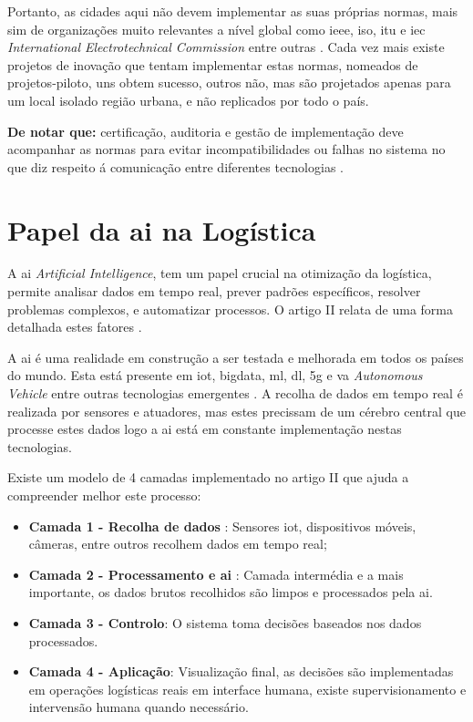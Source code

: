 Portanto, as cidades aqui não devem implementar as suas próprias normas, mais sim de organizações muito relevantes a nível global como \gls{ieee}, \gls{iso}, \gls{itu} e \gls{iec} \textit{International Electrotechnical Commission}  entre outras \cite{article}.
Cada vez mais existe projetos de inovação que tentam implementar estas normas, nomeados de projetos-piloto, uns obtem sucesso, outros não, mas são projetados apenas para um local isolado região urbana, e não replicados por todo o país.

\textbf{De notar que:} certificação, auditoria e gestão de implementação deve acompanhar as normas para evitar incompatibilidades ou falhas no sistema no que diz respeito á comunicação entre diferentes tecnologias \cite{article}.
\section{Papel da \gls{ai} na Logística}
\label{sec:papel_ai_logistica}
A \gls{ai} \textit{Artificial Intelligence}, tem um papel crucial na otimização da logística, permite analisar dados em tempo real, prever padrões específicos, resolver problemas complexos, e automatizar processos. O artigo II relata de uma forma detalhada estes fatores \cite{su162411265}.

A \gls{ai} é uma realidade em construção a ser testada e melhorada em todos os países do mundo. Esta está presente em \gls{iot}, \gls{bigdata}, \gls{ml}, \gls{dl}, \gls{5g} e \gls{va} \textit{Autonomous Vehicle} entre outras tecnologias emergentes \cite{su162411265}.
A recolha de dados em tempo real é realizada por sensores  e atuadores, mas estes precissam de um cérebro central que processe estes dados logo a \gls{ai} está em constante implementação nestas tecnologias.

Existe um modelo de 4 camadas implementado no artigo II  que ajuda a compreender melhor este processo\cite{su162411265}:
\begin{itemize}
    \item \textbf{Camada 1 - Recolha de dados }: Sensores \gls{iot}, dispositivos móveis, câmeras, entre outros recolhem dados em tempo real;
    \item \textbf{Camada 2 - Processamento e \gls{ai} }:  Camada intermédia e a mais importante, os dados brutos recolhidos são limpos e processados pela \gls{ai}.
    \item \textbf{Camada 3 - Controlo}: O sistema toma decisões baseados nos dados processados.
    \item \textbf{Camada 4 - Aplicação}: Visualização final, as decisões são implementadas em operações logísticas reais em interface humana, existe supervisionamento e intervensão humana quando necessário.
\end{itemize}

